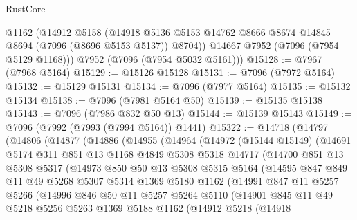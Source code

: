 \begin{lexlean}{RustCore}
\begin{coremodule}
        @1162
        (@14912
          @5158
          (@14918 @5136 @5153 @14762 @8666 @8674 @14845 @8694 (@7096 (@8696 @5153 @5137)) @8704))
        @14667
        @7952
        (@7096 (@7954 @5129 @1168)))
      @7952
      (@7096 (@7954 @5032 @5161)))
@15128 := @7967 (@7968 @5164)
@15129 := @15126 @15128
@15131 := @7096 (@7972 @5164)
@15132 := @15129 @15131
@15134 := @7096 (@7977 @5164)
@15135 := @15132 @15134
@15138 := @7096 (@7981 @5164 @50)
@15139 := @15135 @15138
@15143 := @7096 (@7986 @832 @50 @13)
@15144 := @15139 @15143
@15149 := @7096 (@7992 (@7993 (@7994 @5164)) @1441)
@15322 := @14718
    (@14797
      (@14806
        (@14877
          (@14886
            (@14955
              (@14964
                (@14972
                  (@15144 @15149)
                  (@14691
                    @5174
                    @311
                    @851
                    @13
                    @1168
                    @4849
                    @5308
                    @5318
                    @14717
                    (@14700
                      @851
                      @13
                      @5308
                      @5317
                      (@14973
                        @850
                        @50
                        @13
                        @5308
                        @5315
                        @5164
                        (@14595
                          @847
                          @849
                          @11
                          @49
                          @5268
                          @5307
                          @5314
                          @1369
                          @5180
                          @1162
                          (@14991
                            @847
                            @11
                            @5257
                            @5266
                            (@14996
                              @846
                              @50
                              @11
                              @5257
                              @5264
                              @5110
                              (@14901
                                @845
                                @11
                                @49
                                @5218
                                @5256
                                @5263
                                @1369
                                @5188
                                @1162
                                (@14912
                                  @5218
                                  (@14918

\end{coremodule}
\end{lexlean}
